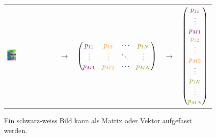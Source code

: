 \begin{figure}[ht]
	\centering
	\begin{tabular}{m{3.5cm} m{1cm} c m{1cm} c}
		\includegraphics[width=0.2\textwidth]{images/vectormatrix/ImageToVector} &
		$\longrightarrow$ &
		$\begin{pmatrix}
			\textcolor{violet}{p_{11}} & \textcolor{orange}{p_{12}} & \cdots & \textcolor{olive}{p_{1N}} \\
			\textcolor{violet}{\vdots} & \textcolor{orange}{\vdots} & \ddots & \textcolor{olive}{\vdots} \\
			\textcolor{violet}{p_{M1}} & \textcolor{orange}{p_{M2}} & \cdots &  \textcolor{olive}{p_{MN}} \\
		\end{pmatrix}$ &
		$\longrightarrow$ &
		$\begin{pmatrix}
			\textcolor{violet}{p_{11}} \\
			\textcolor{violet}{\vdots} \\
			\textcolor{violet}{p_{M1}} \\
			\textcolor{orange}{p_{12}} \\
			\textcolor{orange}{\vdots} \\
			\textcolor{orange}{p_{M2}} \\
			\vdots \\
			\textcolor{olive}{p_{1N}} \\
			\textcolor{olive}{\vdots} \\
			\textcolor{olive}{p_{MN}} \\
		\end{pmatrix}$
	\end{tabular}
	\caption{Ein schwarz-weiss Bild kann als Matrix oder Vektor aufgefasst werden.}
	\label{fig:image_to_vector}
\end{figure}
\pagebreak[4]
